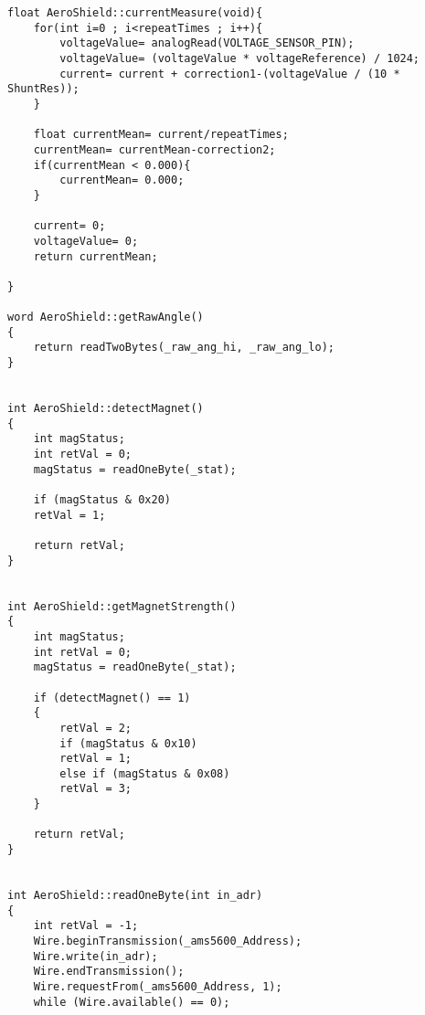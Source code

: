 \begin{lstlisting}[caption={Zdrojový kód súboru AeroShield.cpp.},captionpos=b]
float AeroShield::currentMeasure(void){       
	for(int i=0 ; i<repeatTimes ; i++){                                            
		voltageValue= analogRead(VOLTAGE_SENSOR_PIN);                                       
		voltageValue= (voltageValue * voltageReference) / 1024;                             
		current= current + correction1-(voltageValue / (10 * ShuntRes));     
	}                                                              
	
	float currentMean= current/repeatTimes;             
	currentMean= currentMean-correction2;              
	if(currentMean < 0.000){                           
		currentMean= 0.000;                             
	}
	
	current= 0;               
	voltageValue= 0;         
	return currentMean;  
	
}

word AeroShield::getRawAngle()                                                           
{
	return readTwoBytes(_raw_ang_hi, _raw_ang_lo);                                         
}


int AeroShield::detectMagnet()                                                         
{
	int magStatus;                                                                   
	int retVal = 0;                                                                      
	magStatus = readOneByte(_stat);                                                                  
	
	if (magStatus & 0x20)
	retVal = 1;
	
	return retVal;                                                               
}


int AeroShield::getMagnetStrength()           
{
	int magStatus;                                 
	int retVal = 0;                             
	magStatus = readOneByte(_stat);               
	
	if (detectMagnet() == 1)                         
	{
		retVal = 2;                               
		if (magStatus & 0x10)
		retVal = 1;                               
		else if (magStatus & 0x08)
		retVal = 3;                            
	}
	
	return retVal;                          
}


int AeroShield::readOneByte(int in_adr)       
{
	int retVal = -1;
	Wire.beginTransmission(_ams5600_Address);     
	Wire.write(in_adr);                            
	Wire.endTransmission();                         
	Wire.requestFrom(_ams5600_Address, 1);          
	while (Wire.available() == 0);                   
	

\end{lstlisting}
